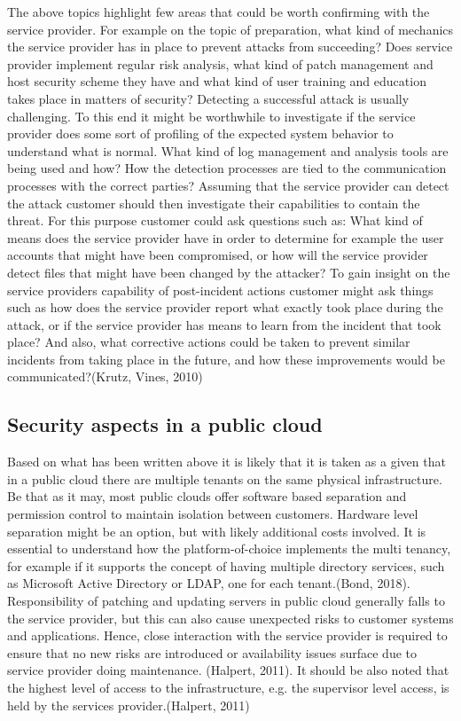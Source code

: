 \documentclass{article}
\begin{document}
The above topics highlight few areas that could be worth confirming with the service provider. For example on the topic of preparation, what kind of mechanics the service provider has in place to prevent attacks from succeeding? Does service provider implement regular risk analysis, what kind of patch management and host security scheme they have and what kind of user training and education takes place in matters of security? Detecting a successful attack is usually challenging. To this end it might be worthwhile to investigate if the service provider does some sort of profiling of the expected system behavior to understand what is normal. What kind of log management and analysis tools are being used and how? How the detection processes are tied to the communication processes with the correct parties? Assuming that the service provider can detect the attack customer should then investigate their capabilities to contain the threat. For this purpose customer could ask questions such as: What kind of means does the service provider have in order to determine for example the user accounts that might have been compromised, or how will the service provider detect files that might have been changed by the attacker? To gain insight on the service providers capability of post-incident actions customer might ask things such as how does the service provider report what exactly took place during the attack, or if the service provider has means to learn from the incident that took place? And also, what corrective actions could be taken to prevent similar incidents from taking place in the future, and how these improvements would be communicated?(Krutz, Vines, 2010)
\subsection{Security aspects in a public cloud}
Based on what has been written above it is likely that it is taken as a given that in a public cloud there are multiple tenants on the same physical infrastructure.
Be that as it may, most public clouds offer software based separation and permission control to maintain isolation between customers. Hardware level separation might be an option, but with likely additional costs involved. It is essential to understand how the platform-of-choice implements the multi tenancy, for example if it supports the concept of having multiple directory services, such as Microsoft Active Directory or LDAP, one for each tenant.(Bond, 2018).
Responsibility of patching and updating servers in public cloud generally falls to the service provider, but this can also cause unexpected risks to customer systems and applications. Hence, close interaction with the service provider is required to ensure that no new risks are introduced  or availability issues surface due to service provider doing maintenance. (Halpert, 2011).
It should be also noted that the highest level of access to the infrastructure, e.g. the supervisor level access, is held by the services provider.(Halpert, 2011)
\end{document}
